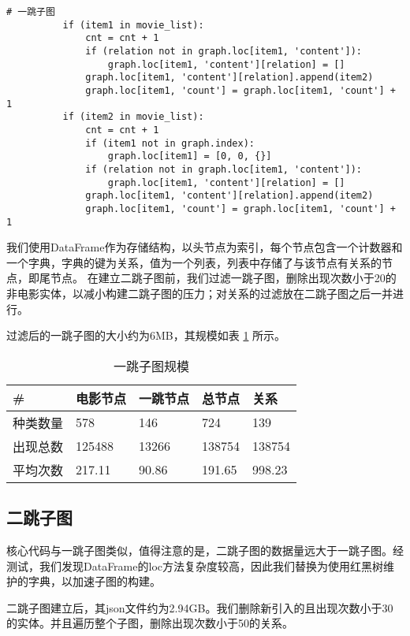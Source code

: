 \documentclass{ctexart}
\begin{document}
\begin{sloppypar}
\begin{lstlisting}[style=Python]
          # 一跳子图
          if (item1 in movie_list):
              cnt = cnt + 1
              if (relation not in graph.loc[item1, 'content']):
                  graph.loc[item1, 'content'][relation] = []
              graph.loc[item1, 'content'][relation].append(item2)
              graph.loc[item1, 'count'] = graph.loc[item1, 'count'] + 1
          if (item2 in movie_list):
              cnt = cnt + 1
              if (item1 not in graph.index):
                  graph.loc[item1] = [0, 0, {}]
              if (relation not in graph.loc[item1, 'content']):
                  graph.loc[item1, 'content'][relation] = []
              graph.loc[item1, 'content'][relation].append(item2)
              graph.loc[item1, 'count'] = graph.loc[item1, 'count'] + 1
\end{lstlisting}

我们使用DataFrame作为存储结构，以头节点为索引，每个节点包含一个计数器和一个字典，字典的键为关系，值为一个列表，列表中存储了与该节点有关系的节点，即尾节点。
在建立二跳子图前，我们过滤一跳子图，删除出现次数小于20的非电影实体，以减小构建二跳子图的压力；对关系的过滤放在二跳子图之后一并进行。

过滤后的一跳子图的大小约为6MB，其规模如表 \ref{tab:0} 所示。

\begin{table}[h]
      \centering
      \caption{一跳子图规模\label{tab:0}}
      \begin{tabular}{lllll}
            \hline
            \#                & 电影节点    & 一跳节点    & 总节点      & 关系          \\ \hline
            种类数量          & 578         & 146         & 724         &  139          \\
            出现总数          & 125488      & 13266       & 138754      & 138754        \\
            平均次数          & 217.11      &90.86        & 191.65      & 998.23        \\
            \hline
      \end{tabular}
\end{table}

\subsection{二跳子图}
核心代码与一跳子图类似，值得注意的是，二跳子图的数据量远大于一跳子图。经测试，我们发现DataFrame的loc方法复杂度较高，因此我们替换为使用红黑树维护的字典，以加速子图的构建。

二跳子图建立后，其json文件约为2.94GB。我们删除新引入的且出现次数小于30的实体。并且遍历整个子图，删除出现次数小于50的关系。


\end{sloppypar}
\end{document}
